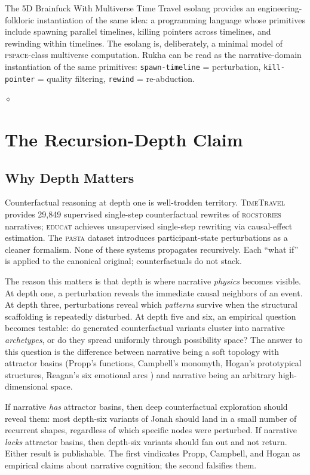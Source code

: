 \documentclass[11pt]{article}
\theoremstyle{rukha}
\newcommand{\diamondrule}{%
  \begin{center}\vspace{0.6em}%
  {\scriptsize $\diamond$}\vspace{0.6em}\end{center}}
\begin{document}
The 5D Brainfuck With Multiverse Time Travel esolang
\cite{fivedbfmtt} provides an engineering-folkloric instantiation of the
same idea: a programming language whose primitives include spawning
parallel timelines, killing pointers across timelines, and rewinding
within timelines. The esolang is, deliberately, a minimal model of
\textsc{pspace}-class multiverse computation. Rukha can be read as the
narrative-domain instantiation of the same primitives:
\texttt{spawn-timeline} = perturbation, \texttt{kill-pointer} = quality
filtering, \texttt{rewind} = re-abduction.

\diamondrule

\section{The Recursion-Depth Claim}

\subsection{Why Depth Matters}

Counterfactual reasoning at depth one is well-trodden territory.
\textsc{TimeTravel} \cite{timetravel} provides 29,849 supervised single-step
counterfactual rewrites of \textsc{rocstories} narratives;
\textsc{educat} \cite{educat} achieves unsupervised single-step rewriting
via causal-effect estimation. The \textsc{pasta} dataset \cite{pasta}
introduces participant-state perturbations as a cleaner formalism. None
of these systems propagates recursively. Each ``what if'' is applied to
the canonical original; counterfactuals do not stack.

The reason this matters is that depth is where narrative \emph{physics}
becomes visible. At depth one, a perturbation reveals the immediate
causal neighbors of an event. At depth three, perturbations reveal which
\emph{patterns} survive when the structural scaffolding is repeatedly
disturbed. At depth five and six, an empirical question becomes
testable: do generated counterfactual variants cluster into
narrative \emph{archetypes}, or do they spread uniformly through
possibility space? The answer to this question is the difference between
narrative being a soft topology with attractor basins (Propp's
functions, Campbell's monomyth, Hogan's prototypical structures, Reagan's
six emotional arcs \cite{reagansixarcs}) and narrative being an
arbitrary high-dimensional space.

If narrative \emph{has} attractor basins, then deep counterfactual
exploration should reveal them: most depth-six variants of Jonah should
land in a small number of recurrent shapes, regardless of which specific
nodes were perturbed. If narrative \emph{lacks} attractor basins, then
depth-six variants should fan out and not return. Either result is
publishable. The first vindicates Propp, Campbell, and Hogan as
empirical claims about narrative cognition; the second falsifies them.
\end{document}
